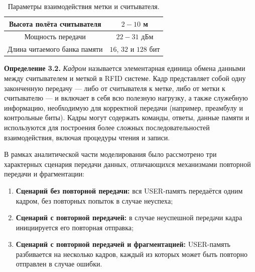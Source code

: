\documentclass[12pt]{article}
\theoremstyle{definition}
\begin{document}
\begin{table}[]
    \centering
    \begin{tabular}{|c|c|}
        \hline
        Высота полёта считывателя & $2-10$ м \\
        \hline
        Мощность передачи & $22-31$ дБм \\
        \hline
        Длина читаемого банка памяти & $16$, $32$ и $128$ бит \\
        \hline
    \end{tabular}
    \caption{Параметры взаимодействия метки и считывателя.}
    \label{table:parameters}
\end{table}



\textbf{Определение 3.2.} \textit{Кадром} называется элементарная единица обмена данными между считывателем и меткой в RFID системе. Кадр представляет собой одну законченную передачу — либо от считывателя к метке, либо от метки к считывателю — и включает в себя всю полезную нагрузку, а также служебную информацию, необходимую для корректной передачи (например, преамбулу и контрольные биты). Кадры могут содержать команды, ответы, данные памяти и используются для построения более сложных последовательностей взаимодействия, включая процедуры чтения и записи.

В рамках аналитической части моделирования было рассмотрено три характерных сценария передачи данных, отличающихся механизмами повторной передачи и фрагментации:
\begin{enumerate}
  \item \textbf{Сценарий без повторной передачи:} вся USER-память передаётся одним кадром, без повторных попыток в случае неуспеха;
  \item \textbf{Сценарий с повторной передачей:} в случае неуспешной передачи кадра инициируется его повторная отправка;
  \item \textbf{Сценарий с повторной передачей и фрагментацией:} USER-память разбивается на несколько кадров, каждый из которых может быть повторно отправлен в случае ошибки.
\end{enumerate}
\end{document}

